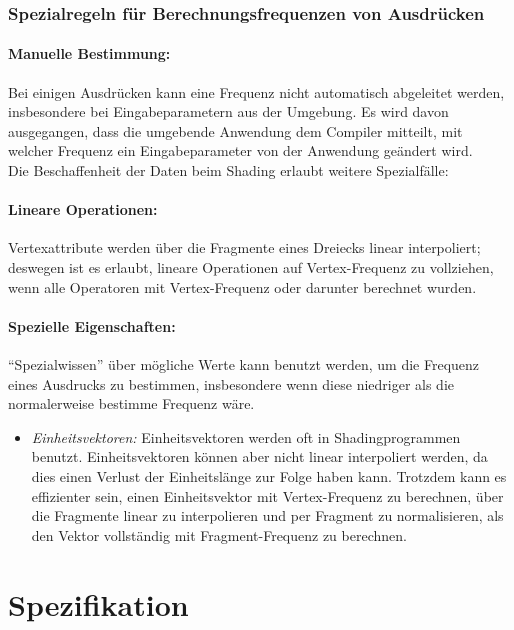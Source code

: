 \documentclass[twoside,a4paper,fleqn,12pt]{article}
\begin{document}
\subsubsection{Spezialregeln für Berechnungsfrequenzen von Ausdrücken}

\paragraph{Manuelle Bestimmung:}
Bei einigen Ausdrücken kann eine Frequenz nicht automatisch abgeleitet werden, insbesondere bei Eingabeparametern aus der
Umgebung. Es wird davon ausgegangen, dass die umgebende Anwendung dem Compiler mitteilt, mit welcher Frequenz ein Eingabeparameter
von der Anwendung geändert wird.\\

Die Beschaffenheit der Daten beim Shading erlaubt
weitere
Spezialfälle:
\paragraph{Lineare Operationen:} Vertexattribute werden über die Fragmente eines Dreiecks linear interpoliert; deswegen ist es
erlaubt, lineare Operationen auf Vertex-Frequenz zu vollziehen, wenn alle Operatoren mit Vertex-Frequenz oder darunter
berechnet wurden.

\paragraph{Spezielle Eigenschaften:} "`Spezialwissen"' über mögliche Werte kann benutzt werden, um die Frequenz eines
Ausdrucks zu bestimmen, insbesondere wenn diese niedriger als die normalerweise bestimme Frequenz wäre.
\begin{itemize}
\item \emph{Einheitsvektoren:} Einheitsvektoren werden oft in Shadingprogrammen benutzt. Einheitsvektoren können aber 
nicht linear interpoliert werden, da dies einen Verlust der Einheitslänge zur Folge haben kann. Trotzdem kann es effizienter
sein, einen Einheitsvektor mit Vertex-Frequenz zu berechnen, über die Fragmente linear zu interpolieren und per Fragment
zu normalisieren, als den Vektor vollständig mit Fragment-Frequenz zu berechnen.
\end{itemize}

\newpage
\section{Spezifikation}
\end{document}
